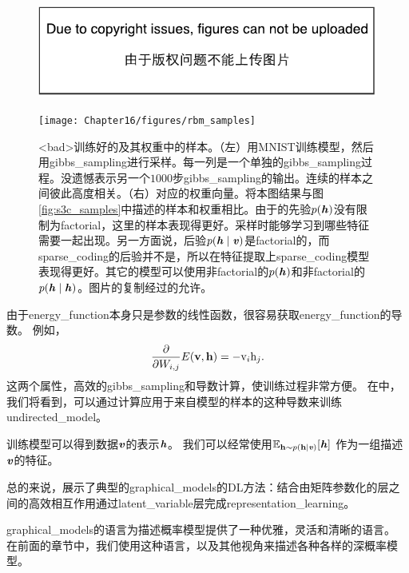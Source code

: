 \begin{figure}[!htb]
\ifOpenSource
\centerline{\includegraphics{figure.pdf}}
\else
	\centerline{\texttt{[image: Chapter16/figures/rbm\_samples]}}	
\fi
	\caption{<bad>训练好的及其权重中的样本。（左）用MNIST训练模型，然后用\gls{gibbs_sampling}进行采样。每一列是一个单独的\gls{gibbs_sampling}过程。没遗憾表示另一个$1000$步\gls{gibbs_sampling}的输出。连续的样本之间彼此高度相关。（右）对应的权重向量。将本图结果与图\ref{fig:s3c_samples}中描述的样本和权重相比。由于的先验$p(\boldsymbol{\mathit{h}})$没有限制为\gls{factorial}，这里的样本表现得更好。采样时能够学习到哪些特征需要一起出现。另一方面说，后验$p(\boldsymbol{\mathit{h}} \mid \boldsymbol{\mathit{v}})$是\gls{factorial}的，而\gls{sparse_coding}的后验并不是，所以在特征提取上\gls{sparse_coding}模型表现得更好。其它的模型可以使用非\gls{factorial}的$p(\boldsymbol{\mathit{h}})$和非\gls{factorial}的$p(\boldsymbol{\mathit{h}} \mid \boldsymbol{\mathit{h}})$。图片的复制经过\citet{lisa_tutorial_rbm}的允许。}
	\label{fig:rbm_sample}
\end{figure}


由于\gls{energy_function}本身只是参数的线性函数，很容易获取\gls{energy_function}的导数。 例如，
\begin{align}
\label{eqn:1615}
\frac{\partial}{\partial W_{i,j}} E(\mathbf{v},\mathbf{h}) = - \mathrm{v}_i \mathrm{h}_j.
\end{align}
这两个属性，高效的\gls{gibbs_sampling}和导数计算，使训练过程非常方便。
在中，我们将看到，可以通过计算应用于来自模型的样本的这种导数来训练\gls{undirected_model}。

训练模型可以得到数据$\boldsymbol{\mathit{v}}$的表示$\boldsymbol{\mathit{h}}$。
我们可以经常使用$\mathbb{E}_{\mathbf{h}\sim p(\mathbf{h}\mid\boldsymbol{\mathit{v}})}[\boldsymbol{\mathit{h}}]$ 作为一组描述$\boldsymbol{\mathit{v}}$的特征。



总的来说，展示了典型的\gls{graphical_models}的\gls{DL}方法：结合由矩阵参数化的层之间的高效相互作用通过\gls{latent_variable}层完成\gls{representation_learning}。


\gls{graphical_models}的语言为描述概率模型提供了一种优雅，灵活和清晰的语言。 在前面的章节中，我们使用这种语言，以及其他视角来描述各种各样的深概率模型。




